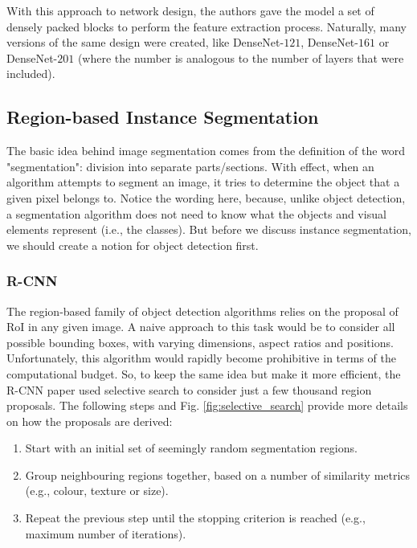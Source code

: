 With this approach to network design, the authors gave the model a set of densely packed blocks to perform the feature extraction process. Naturally, many versions of the same design were created, like DenseNet-$121$, DenseNet-$161$ or DenseNet-$201$ (where the number is analogous to the number of layers that were included).

\subsection{Region-based Instance Segmentation}
\label{subsec:chap2_region_based_instance_segmentation}

The basic idea behind image segmentation comes from the definition of the word "segmentation": division into separate parts/sections. With effect, when an algorithm attempts to segment an image, it tries to determine the object that a given pixel belongs to. Notice the wording here, because, unlike object detection, a segmentation algorithm does not need to know what the objects and visual elements represent (i.e., the classes). But before we discuss instance segmentation, we should create a notion for object detection first. 

\subsubsection{\ac{R-CNN}}
\label{subsubsec:chap2_rcnn}

The region-based family of object detection algorithms relies on the proposal of \ac{RoI} in any given image. A naive approach to this task would be to consider all possible bounding boxes, with varying dimensions, aspect ratios and positions. Unfortunately, this algorithm would rapidly become prohibitive in terms of the computational budget. So, to keep the same idea but make it more efficient, the \ac{R-CNN} paper \cite{r_cnn} used selective search \cite{selective_search} to consider just a few thousand region proposals. The following steps and Fig. \ref{fig:selective_search} provide more details on how the proposals are derived:

\begin{enumerate}
    \item Start with an initial set of seemingly random segmentation regions.
    \item Group neighbouring regions together, based on a number of similarity metrics (e.g., colour, texture or size).
    \item Repeat the previous step until the stopping criterion is reached (e.g., maximum number of iterations).
\end{enumerate}

